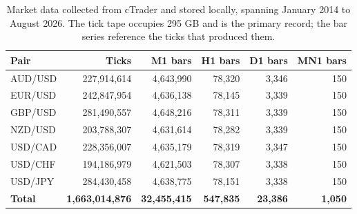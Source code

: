 \begin{table}[htb!]
\centering
\footnotesize
\begin{tabular}{@{}lrrrrr@{}}
\toprule
\textbf{Pair} & \textbf{Ticks} & \textbf{M1 bars} & \textbf{H1 bars} & \textbf{D1 bars} & \textbf{MN1 bars} \\
\midrule
AUD/USD & 227,914,614 & 4,643,990 & 78,320 & 3,346 & 150 \\
EUR/USD & 242,847,954 & 4,636,138 & 78,145 & 3,339 & 150 \\
GBP/USD & 281,490,557 & 4,648,216 & 78,311 & 3,339 & 150 \\
NZD/USD & 203,788,307 & 4,631,614 & 78,282 & 3,339 & 150 \\
USD/CAD & 228,356,007 & 4,635,179 & 78,319 & 3,347 & 150 \\
USD/CHF & 194,186,979 & 4,621,503 & 78,307 & 3,338 & 150 \\
USD/JPY & 284,430,458 & 4,638,775 & 78,151 & 3,338 & 150 \\
\midrule
\textbf{Total} & \textbf{1,663,014,876} & \textbf{32,455,415} & \textbf{547,835} & \textbf{23,386} & \textbf{1,050} \\
\bottomrule
\end{tabular}
\caption{Market data collected from cTrader and stored locally, spanning January 2014 to August 2026. The tick tape occupies 295 GB and is the primary record; the bar series reference the ticks that produced them.}
\label{Tables:DataInventory}
\end{table}